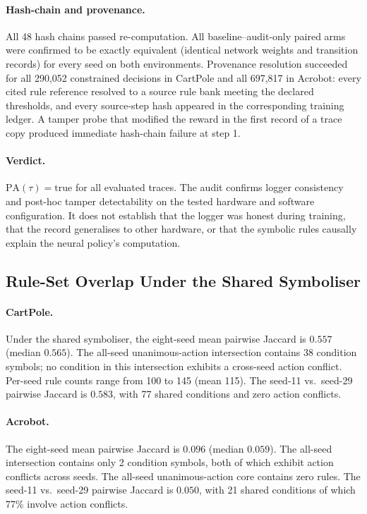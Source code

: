 \documentclass[12pt]{article}
\newcommand{\PA}{\mathrm{PA}}       %
\begin{document}
\paragraph{Hash-chain and provenance.}
All 48 hash chains passed re-computation.
All baseline--audit-only paired arms were confirmed to be exactly equivalent
(identical network weights and transition records) for every seed on both
environments.
Provenance resolution succeeded for all 290{,}052 constrained decisions in
CartPole and all 697{,}817 in Acrobot:
every cited rule reference resolved to a source rule bank meeting the
declared thresholds, and every source-step hash appeared in the corresponding
training ledger.
A tamper probe that modified the reward in the first record of a trace copy
produced immediate hash-chain failure at step 1.

\paragraph{Verdict.}
$\PA(\tau) = \mathrm{true}$ for all evaluated traces.
The audit confirms logger consistency and post-hoc tamper detectability
on the tested hardware and software configuration.
It does not establish that the logger was honest during training, that
the record generalises to other hardware, or that the symbolic rules
causally explain the neural policy's computation.

\subsection{Rule-Set Overlap Under the Shared Symboliser}
\label{sec:results:overlap}

\paragraph{CartPole.}
Under the shared symboliser, the eight-seed mean pairwise Jaccard is
$0.557$ (median $0.565$).
The all-seed unanimous-action intersection contains 38 condition symbols;
no condition in this intersection exhibits a cross-seed action conflict.
Per-seed rule counts range from 100 to 145 (mean 115).
The seed-11 vs.\ seed-29 pairwise Jaccard is $0.583$, with 77 shared
conditions and zero action conflicts.

\paragraph{Acrobot.}
The eight-seed mean pairwise Jaccard is $0.096$ (median $0.059$).
The all-seed intersection contains only 2 condition symbols, both of
which exhibit action conflicts across seeds.
The all-seed unanimous-action core contains zero rules.
The seed-11 vs.\ seed-29 pairwise Jaccard is $0.050$, with 21 shared
conditions of which 77\% involve action conflicts.
\end{document}
